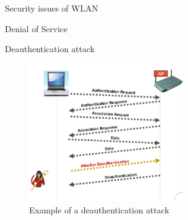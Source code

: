 \begin{section}{Security issues of WLAN}
\begin{subsection}{Denial of Service}
\begin{subsubsection}{Deauthentication attack}
      \begin{figure}[h]
        \centering
        \includegraphics[width=0.6\textwidth]{img/wireless/deauthentication attack.png}
        \caption{Example of a deauthentication attack}
      \end{figure}


\end{subsubsection}
\end{subsection}
\end{section}
